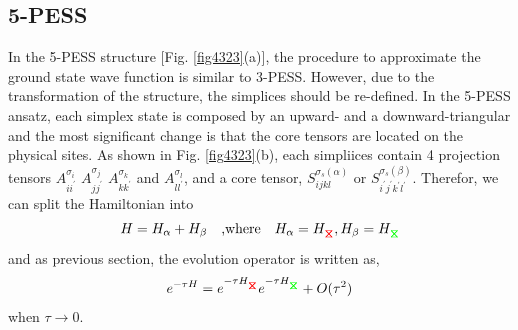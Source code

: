 \subsection{5-PESS}
In the 5-PESS structure [Fig. \ref{fig4323}(a)], the procedure to approximate the ground state wave function is similar to 3-PESS. However, due to the transformation of the structure, the simplices should be re-defined. In the 5-PESS ansatz, each simplex state is composed by an upward- and a downward-triangular and the most significant change is that the core tensors are located on the physical sites. As shown in Fig. \ref{fig4323}(b), each simpliices contain 4 projection tensors $A^{\sigma_i}_{ii^{\prime}}$ $A^{\sigma_j}_{jj^{\prime}}$ $A^{\sigma_k}_{kk^{\prime}}$ and $A^{\sigma_l}_{ll^{\prime}}$, and a core tensor, $S^{\sigma_s (\alpha)}_{ijkl}$ or $S^{\sigma_s (\beta)}_{i^{\prime}j^{\prime}k^{\prime}l^{\prime}}$. Therefor, we can split the Hamiltonian into 
\begin{align}
	H = H_{\alpha} + H_{\beta} \quad \text{,where} \quad H_{\alpha} = H_{\rjoinr}, H_{\beta} = H_{\rjoing}
\end{align}
and as previous section, the evolution operator is written as, 
\begin{align}
	e^{-\tau H} = e^{-\tau H_{\rjoinr}} e^{-\tau H_{\rjoing}} + O(\tau^2)
\end{align}
when $\tau \rightarrow 0$.

